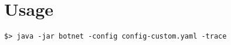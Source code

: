 \section{Usage}
\label{sec:usage}

\lipsum[1]

\begin{verbatim}
$> java -jar botnet -config config-custom.yaml -trace
\end{verbatim}

\lipsum[1]
